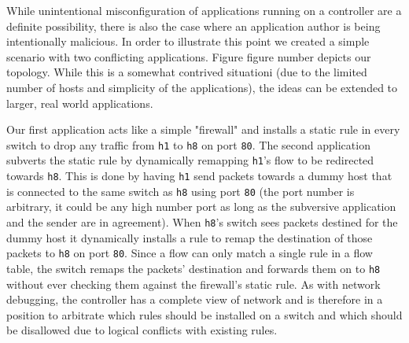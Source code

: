 
While unintentional misconfiguration of applications running on a controller are a definite possibility, there is also the case where an application author is being intentionally malicious.
In order to illustrate this point we created a simple scenario with two conflicting applications.
Figure {figure number} depicts our topology.
While this is a somewhat contrived situationi (due to the limited number of hosts and simplicity of the applications), the ideas can be extended to larger, real world applications.

Our first application acts like a simple "firewall" and installs a static rule in every switch to drop any traffic from \texttt{h1} to \texttt{h8} on port \texttt{80}.
The second application subverts the static rule by dynamically remapping \texttt{h1}'s flow to be redirected towards \texttt{h8}.
This is done by having \texttt{h1} send packets towards a dummy host that is connected to the same switch as \texttt{h8} using port \texttt{80} (the port number is arbitrary, it could be any high number port as long as the subversive application and the sender are in agreement).
When \texttt{h8}'s switch sees packets destined for the dummy host it dynamically installs a rule to remap the destination of those packets to \texttt{h8} on port \texttt{80}.
Since a flow can only match a single rule in a flow table, the switch remaps the packets' destination and forwards them on to \texttt{h8} without ever checking them against the firewall's static rule.
As with network debugging, the controller has a complete view of network and is therefore in a position to arbitrate which rules should be installed on a switch and which should be disallowed due to logical conflicts with existing rules.

